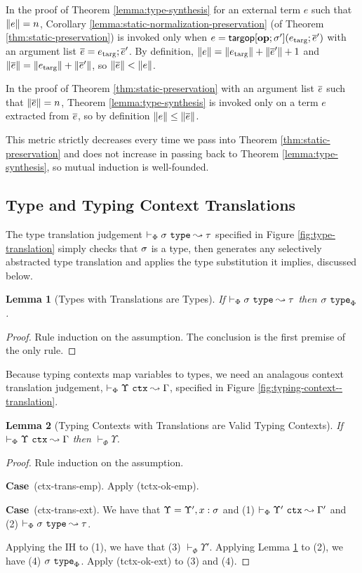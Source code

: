 \documentclass[12pt]{article}
\newtheorem{lemma}{Lemma}
\newcommand{\pfcase}[1]{\textbf{Case}~#1. }
\begin{document}
In the proof of Theorem \ref{lemma:type-synthesis} for an external term $e$ such that $\|e\|=n$, Corollary \ref{lemma:static-normalization-preservation} (of Theorem \ref{thm:static-preservation}) is invoked only when $e={\sf targop}[\textbf{op}; \sigma'](e_\text{targ}; \overline{e}')$ with an argument list $\overline{e}=e_\text{targ}; \overline{e}'$. By definition, $\|e\|=\|e_\text{targ}\| + \|\overline{e}'\| + 1$ and $\|\overline{e}\|=\|e_\text{targ}\| + \|\overline{e}'\|$, so $\|\overline{e}\| < \|e\|$.

In the proof of Theorem \ref{thm:static-preservation} with an argument list $\overline{e}$ such that $\|\overline{e}\|=n$, Theorem \ref{lemma:type-synthesis} is invoked only on a term $e$ extracted from $\overline{e}$, so by definition $\|e\| \leq \|\overline{e}\|$. 

This metric strictly decreases every time we pass into Theorem \ref{thm:static-preservation} and does not increase in passing back to Theorem \ref{lemma:type-synthesis}, so mutual induction is well-founded.

\subsection{Type and Typing Context Translations}
The type translation judgement $\vdash_{\Phi} \sigma~\mathtt{type} \leadsto \tau$ specified in Figure \ref{fig:type-translation} simply checks that $\sigma$ is a type, then generates any selectively abstracted type translation and applies the type substitution it implies, discussed below.

\begin{lemma}[Types with Translations are Types]
\label{lemma:types-with-translations-are-types}
If $\vdash_{\Phi} \sigma~\mathtt{type} \leadsto \tau$ then $\sigma~\mathtt{type}_{\Phi}$.
\end{lemma}
\begin{proof} Rule induction on the assumption. The conclusion is the first premise of the only rule.\end{proof}

Because typing contexts map variables to types, we need an analagous context translation judgement, $\vdash_{\Phi} \Upsilon~\mathtt{ctx} \leadsto \Gamma$, specified in Figure \ref{fig:typing-context--translation}.

\begin{lemma}[Typing Contexts with Translations are Valid Typing Contexts]
If $\vdash_{\Phi} \Upsilon~\mathtt{ctx} \leadsto \Gamma$ then $\vdash_\Phi \Upsilon$.
\end{lemma}
\begin{proof} Rule induction on the assumption.

\pfcase{(ctx-trans-emp)} Apply (tctx-ok-emp).

\pfcase{(ctx-trans-ext)} We have that $\Upsilon=\Upsilon', x : \sigma$ and (1) $\vdash_{\Phi} \Upsilon'~\mathtt{ctx} \leadsto \Gamma'$ and (2) $\vdash_{\Phi} \sigma~\mathtt{type} \leadsto \tau$. 

Applying the IH to (1), we have that (3) $\vdash_\Phi \Upsilon'$. Applying Lemma \ref{lemma:types-with-translations-are-types} to (2), we have (4) $\sigma~\mathtt{type}_{\Phi}$. Apply (tctx-ok-ext) to (3) and (4).
\end{proof}
\end{document}

